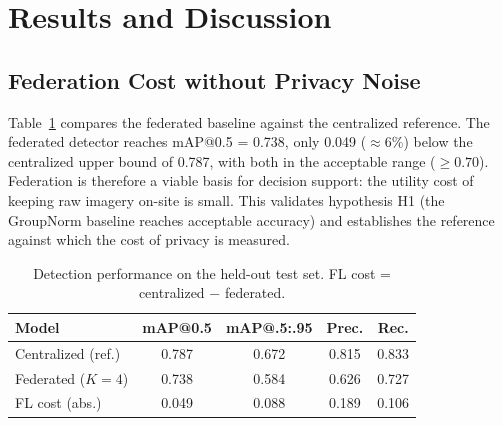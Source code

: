 \documentclass[twocolumn,a4paper,10pt]{article}
\begin{document}
\section{Results and Discussion}

\subsection{Federation Cost without Privacy Noise}
Table~\ref{tab:acc} compares the federated baseline against the centralized
reference. The federated detector reaches mAP@0.5 = 0.738, only 0.049 ($\approx$6\%)
below the centralized upper bound of 0.787, with both in the acceptable range
($\geq 0.70$). Federation is therefore a viable basis for decision support: the
utility cost of keeping raw imagery on-site is small. This validates hypothesis
H1 (the GroupNorm baseline reaches acceptable accuracy) and establishes the
reference against which the cost of privacy is measured.

\begin{table}[ht]
\centering
\caption{Detection performance on the held-out test set. FL cost =
centralized $-$ federated.}
\label{tab:acc}
\small
\setlength{\tabcolsep}{4pt}
\begin{tabular}{lcccc}
\toprule
\textbf{Model} & \textbf{mAP@0.5} & \textbf{mAP@.5:.95} & \textbf{Prec.} & \textbf{Rec.} \\
\midrule
Centralized (ref.) & 0.787 & 0.672 & 0.815 & 0.833 \\
Federated ($K{=}4$) & 0.738 & 0.584 & 0.626 & 0.727 \\
FL cost (abs.)     & 0.049 & 0.088 & 0.189 & 0.106 \\
\bottomrule
\end{tabular}
\end{table}
\end{document}
